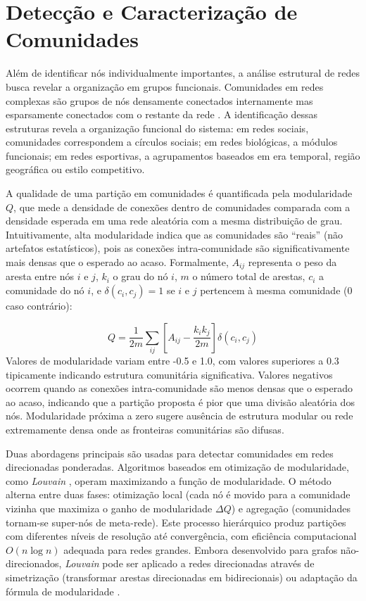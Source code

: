 \section{Detecção e Caracterização de Comunidades}

Além de identificar nós individualmente importantes, a análise estrutural de redes busca revelar a organização em grupos funcionais. Comunidades em redes complexas são grupos de nós densamente conectados internamente mas esparsamente conectados com o restante da rede \cite{Fortunato2010CommunityDetection}. A identificação dessas estruturas revela a organização funcional do sistema: em redes sociais, comunidades correspondem a círculos sociais; em redes biológicas, a módulos funcionais; em redes esportivas, a agrupamentos baseados em era temporal, região geográfica ou estilo competitivo.

A qualidade de uma partição em comunidades é quantificada pela modularidade $Q$, que mede a densidade de conexões dentro de comunidades comparada com a densidade esperada em uma rede aleatória com a mesma distribuição de grau. Intuitivamente, alta modularidade indica que as comunidades são ``reais'' (não artefatos estatísticos), pois as conexões intra-comunidade são significativamente mais densas que o esperado ao acaso. Formalmente, $A_{ij}$ representa o peso da aresta entre nós $i$ e $j$, $k_i$ o grau do nó $i$, $m$ o número total de arestas, $c_i$ a comunidade do nó $i$, e $\delta(c_i, c_j) = 1$ se $i$ e $j$ pertencem à mesma comunidade (0 caso contrário):

\[
Q = \frac{1}{2m} \sum_{ij} \left[ A_{ij} - \frac{k_i k_j}{2m} \right] \delta(c_i, c_j)
\] Valores de modularidade variam entre -0.5 e 1.0, com valores superiores a 0.3 tipicamente indicando estrutura comunitária significativa. Valores negativos ocorrem quando as conexões intra-comunidade são menos densas que o esperado ao acaso, indicando que a partição proposta é pior que uma divisão aleatória dos nós. Modularidade próxima a zero sugere ausência de estrutura modular ou rede extremamente densa onde as fronteiras comunitárias são difusas.

Duas abordagens principais são usadas para detectar comunidades em redes direcionadas ponderadas. Algoritmos baseados em otimização de modularidade, como \textit{Louvain} \cite{Blondel2008Louvain}, operam maximizando a função de modularidade. O método alterna entre duas fases: otimização local (cada nó é movido para a comunidade vizinha que maximiza o ganho de modularidade $\Delta Q$) e agregação (comunidades tornam-se super-nós de meta-rede). Este processo hierárquico produz partições com diferentes níveis de resolução até convergência, com eficiência computacional $O(n \log n)$ adequada para redes grandes. Embora desenvolvido para grafos não-direcionados, \textit{Louvain} pode ser aplicado a redes direcionadas através de simetrização (transformar arestas direcionadas em bidirecionais) ou adaptação da fórmula de modularidade \cite{Leicht2008CommunityStructure}.

